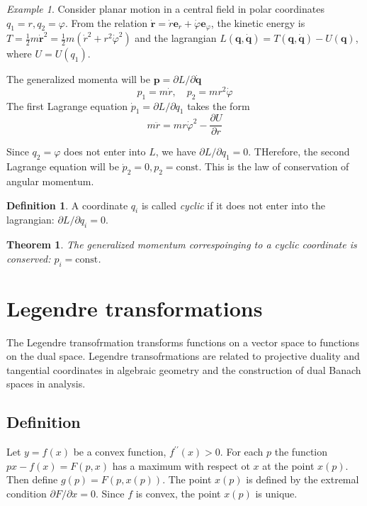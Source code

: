 \documentclass[conference]{IEEEtran}
\newtheorem{theorem}{Theorem}[section]
\theoremstyle{definition}
\newtheorem{definition}{Definition}[section]
\theoremstyle{remark}
\newtheorem{exmp}{Example}
\begin{document}
    \begin{exmp}
        Consider planar motion in a central field in polar coordinates $q_1 = r, q_2 = \varphi$. From the relation $\dot{\mathbf{r}} = \dot{r} \mathbf{e}_r + \dot{\varphi} \mathbf{e}_{\varphi}$, the kinetic energy is $T = \frac12m\dot{\mathbf{r}}^2 = \frac12m(\dot{r}^2 + r^2 \dot{\varphi}^2)$ and the lagrangian $L(\mathbf{q}, \dot{\mathbf{q}}) = T(\mathbf{q}, \dot{\mathbf{q}}) - U(\mathbf{q})$, where $U = U(q_1)$.

        The generalized momenta will be $\mathbf{p} = \partial L / \partial \dot{\mathbf{q}}$
        \begin{equation*}
            p_1 = m\dot{r}, \quad p_2 = mr^2 \dot{\varphi}
        \end{equation*}
        The first Lagrange equation $\dot{p}_1 = \partial L / \partial q_1$ takes the form
        \begin{equation*}
            m\ddot{r} = mr\dot{\varphi}^2  - \dfrac{\partial U}{\partial r}
        \end{equation*}

        Since $q_2 = \varphi$ does not enter into $L$, we have $\partial L / \partial q_1 = 0$. THerefore, the second Lagrange equation will be $\dot{p}_2 = 0, p_2 = \text{const}$. This is the law of conservation of angular momentum.
    \end{exmp}

    \begin{definition}
        A coordinate $q_i$ is called \emph{cyclic} if it does not enter into the lagrangian: $\partial L / \partial q_i = 0$.
    \end{definition}

    \begin{theorem}
        The generalized momentum correspoinging to a cyclic coordinate is conserved: $p_i = \text{const}$.
    \end{theorem}

    \section{Legendre transformations}
    The Legendre transofrmation transforms functions on a vector space to functions on the dual space. Legendre transofrmations are related to projective duality and tangential coordinates in algebraic geometry and the construction of dual Banach spaces in analysis.

    \subsection{Definition}
    Let $y = f(x)$ be a convex function, $f^{\prime\prime}(x) > 0$. For each $p$ the function $px-f(x) = F(p, x)$ has a maximum with respect ot $x$ at the point $x(p)$. Then define $g(p) = F(p, x(p))$. The point $x(p)$ is defined by the extremal condition $\partial F / \partial x = 0$. Since $f$ is convex, the point $x(p)$ is unique.
\end{document}
